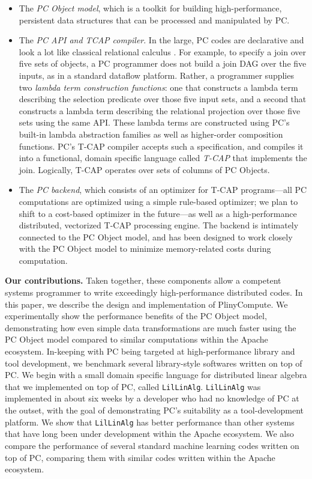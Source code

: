 \begin{itemize}
\item The \emph{PC Object model}, which is a toolkit for building high-performance, persistent data structures that can be 
processed and manipulated by PC.  

\item The \emph{PC API and TCAP compiler}.  In the large, PC codes are declarative and look a lot like classical relational
calculus \cite{}.  For example, to specify a join over five sets of objects, a PC programmer does not build a join DAG over the five inputs, as in a standard
dataflow platform.  Rather, a programmer 
supplies two \emph{lambda term construction functions}: one that constructs a lambda term describing the selection
predicate over those five input sets, 
and a second that constructs a lambda term describing the relational projection over those five sets
using the same API.  These lambda terms are constructed using PC's built-in lambda abstraction families as well as higher-order composition functions.
 PC's T-CAP compiler 
accepts such a specification, and compiles it into a functional, domain specific language called \emph{T-CAP} that implements
the join.  Logically, T-CAP operates over
sets of columns of PC Objects. 

\item The \emph{PC backend}, which consists of an optimizer for T-CAP programs---all PC computations are optimized using a simple rule-based
optimizer; we plan to shift to a cost-based optimizer in the future---as well as a high-performance distributed, vectorized T-CAP processing engine.
The backend is intimately connected to the PC Object model, 
and has been designed to work closely with the PC Object model to minimize memory-related costs during computation.


\end{itemize}

\vspace{5 pt}
\noindent
\textbf{Our contributions.}
Taken together, these components allow a competent systems programmer to write exceedingly high-performance distributed codes.
In this paper, we describe the design and implementation of PlinyCompute.  We experimentally show the performance benefits of the PC Object model, 
demonstrating how even simple data transformations are much faster using the PC Object model compared to similar computations within the 
Apache ecosystem.
In-keeping with PC being targeted at high-performance
library and tool development,
we benchmark several library-style softwares written on top of PC.  We begin with a small domain specific language
for distributed linear algebra that we implemented on top of PC, called \texttt{LilLinAlg}.  \texttt{LilLinAlg} was implemented in about six weeks by a developer
who had no knowledge of PC at the outset, with the goal of demonstrating PC's suitability as a tool-development platform.  
We show that \texttt{LilLinAlg} has better performance than other systems that have long been under development
within the Apache ecosystem.   
We also compare the performance of several standard machine learning codes written on top of PC, comparing them with similar
codes written within the Apache ecosystem.  

